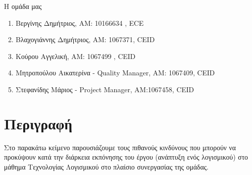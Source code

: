 \documentclass{article}
\begin{document}
\noindent Η ομάδα μας

\begin{enumerate}
  \item Βεργίνης Δημήτριος, ΑΜ: 10166634 , ECE
  \item Βλαχογιάννης Δημήτριος, ΑΜ: 1067371, CEID
  \item Κούρου Αγγελική, ΑΜ: 1067499 , CEID
  \item Μητροπούλου Αικατερίνα - Quality Manager, ΑΜ: 1067409, CEID
  \item Στεφανίδης Μάριος - Project Manager, ΑΜ:1067458, CEID
\end{enumerate}

\section{Περιγραφή}
   Στο παρακάτω κείμενο παρουσιάζουμε τους πιθανούς κινδύνους που μπορούν να προκύψουν κατά την διάρκεια εκπόνησης του έργου (ανάπτυξη ενός λογισμικού) στο μάθημα Τεχνολογίας Λογισμικού στο πλαίσιο συνεργασίας της ομάδας.
   
\vspace{0.5cm}
\end{document}

